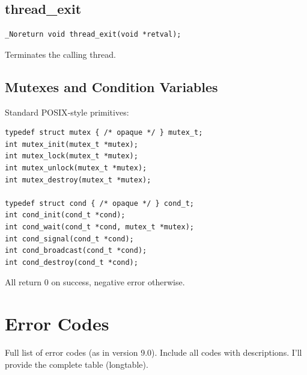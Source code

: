 \documentclass[12pt,a4paper]{article}
\begin{document}
\subsection{thread\_exit}
\begin{lstlisting}
_Noreturn void thread_exit(void *retval);
\end{lstlisting}
Terminates the calling thread.

\subsection{Mutexes and Condition Variables}
Standard POSIX‑style primitives:
\begin{lstlisting}
typedef struct mutex { /* opaque */ } mutex_t;
int mutex_init(mutex_t *mutex);
int mutex_lock(mutex_t *mutex);
int mutex_unlock(mutex_t *mutex);
int mutex_destroy(mutex_t *mutex);

typedef struct cond { /* opaque */ } cond_t;
int cond_init(cond_t *cond);
int cond_wait(cond_t *cond, mutex_t *mutex);
int cond_signal(cond_t *cond);
int cond_broadcast(cond_t *cond);
int cond_destroy(cond_t *cond);
\end{lstlisting}
All return 0 on success, negative error otherwise.

\section{Error Codes}
\label{sec:errors}

Full list of error codes (as in version 9.0). Include all codes with descriptions. I'll provide the complete table (longtable).
\end{document}
